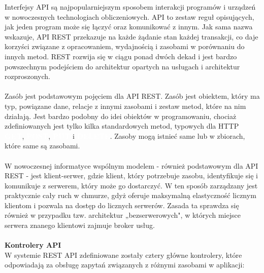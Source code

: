 \documentclass[12pt,a4paper]{article}
\begin{document}
\noindent
Interfejsy API są najpopularniejszym sposobem interakcji programów i urządzeń w nowoczesnych technologiach obliczeniowych. API to zestaw reguł opisujących, jak jeden program może się łączyć oraz komunikować z innym. Jak sama nazwa wskazuje, API REST przekazuje na każde żądanie stan każdej transakcji, co daje korzyści związane z opracowaniem, wydajnością i zasobami w porównaniu do innych metod. REST rozwija się w ciągu ponad dwóch dekad i jest bardzo powszechnym podejściem do architektur opartych na usługach i architektur rozproszonych.
\\\\
Zasób jest podstawowym pojęciem dla API REST. Zasób jest obiektem, który ma typ, powiązane dane, relacje z innymi zasobami i zestaw metod, które na nim działają. Jest bardzo podobny do idei obiektów w programowaniu, chociaż zdefiniowanych jest tylko kilka standardowych metod, typowych dla HTTP \textbf{\colorbox{cyan!90}{\textcolor{white}{GET}}}, \textbf{\colorbox{green!90}{\textcolor{white}{POST}}}, \textbf{\colorbox{orange!90}{\textcolor{white}{PUT}}} i \textbf{\colorbox{red!90}{\textcolor{white}{DELETE}}}. Zasoby mogą istnieć same lub w zbiorach, które same są zasobami.
\\\\
W nowoczesnej informatyce wspólnym modelem - również podstawowym dla API REST - jest klient-serwer, gdzie klient, który potrzebuje zasobu, identyfikuje się i komunikuje z serwerem, który może go dostarczyć. W ten sposób zarządzany jest praktycznie cały ruch w chmurze, gdyż oferuje maksymalną elastyczność licznym klientom i pozwala na dostęp do licznych serwerów. Zasada ta sprawdza się również w przypadku tzw. architektur „bezserwerowych", w których miejsce serwera znanego klientowi zajmuje broker usług.
\\\\

\noindent \textbf{Kontrolery API} \\
W systemie REST API zdefiniowane zostały cztery główne kontrolery, które odpowiadają za obsługę zapytań związanych z różnymi zasobami w aplikacji:
\end{document}
